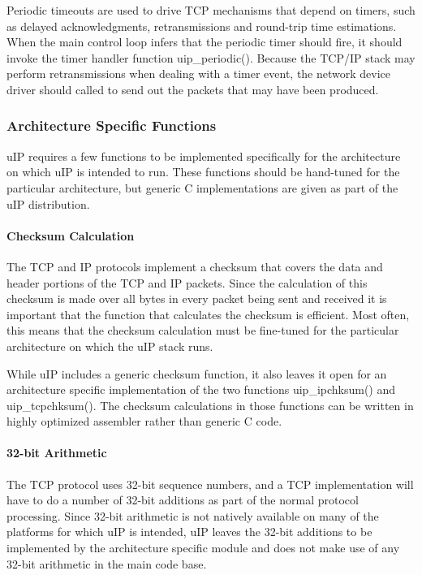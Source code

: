 Periodic timeouts are used to drive T\+CP mechanisms that depend on timers, such as delayed acknowledgments, retransmissions and round-\/trip time estimations. When the main control loop infers that the periodic timer should fire, it should invoke the timer handler function uip\+\_\+periodic(). Because the T\+C\+P/\+IP stack may perform retransmissions when dealing with a timer event, the network device driver should called to send out the packets that may have been produced.\hypertarget{a00074_arch}{}\subsubsection{Architecture Specific Functions}\label{a00074_arch}
u\+IP requires a few functions to be implemented specifically for the architecture on which u\+IP is intended to run. These functions should be hand-\/tuned for the particular architecture, but generic C implementations are given as part of the u\+IP distribution.\hypertarget{a00074_checksums}{}\paragraph{Checksum Calculation}\label{a00074_checksums}
The T\+CP and IP protocols implement a checksum that covers the data and header portions of the T\+CP and IP packets. Since the calculation of this checksum is made over all bytes in every packet being sent and received it is important that the function that calculates the checksum is efficient. Most often, this means that the checksum calculation must be fine-\/tuned for the particular architecture on which the u\+IP stack runs.

While u\+IP includes a generic checksum function, it also leaves it open for an architecture specific implementation of the two functions uip\+\_\+ipchksum() and uip\+\_\+tcpchksum(). The checksum calculations in those functions can be written in highly optimized assembler rather than generic C code.\hypertarget{a00074_longarith}{}\paragraph{32-\/bit Arithmetic}\label{a00074_longarith}
The T\+CP protocol uses 32-\/bit sequence numbers, and a T\+CP implementation will have to do a number of 32-\/bit additions as part of the normal protocol processing. Since 32-\/bit arithmetic is not natively available on many of the platforms for which u\+IP is intended, u\+IP leaves the 32-\/bit additions to be implemented by the architecture specific module and does not make use of any 32-\/bit arithmetic in the main code base.

